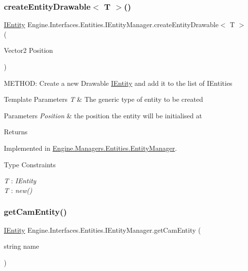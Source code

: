 \subsubsection{\texorpdfstring{create\+Entity\+Drawable$<$ T $>$()}{createEntityDrawable< T >()}}
{\footnotesize\ttfamily \hyperlink{a00438}{I\+Entity} Engine.\+Interfaces.\+Entities.\+I\+Entity\+Manager.\+create\+Entity\+Drawable$<$ T $>$ (\begin{DoxyParamCaption}\item[{Vector2}]{Position }\end{DoxyParamCaption})}



M\+E\+T\+H\+OD\+: Create a new Drawable \hyperlink{a00438}{I\+Entity} and add it to the list of I\+Entities 


\begin{DoxyTemplParams}{Template Parameters}
{\em T} & The generic type of entity to be created\\
\hline
\end{DoxyTemplParams}

\begin{DoxyParams}{Parameters}
{\em Position} & the position the entity will be initialised at\\
\hline
\end{DoxyParams}
\begin{DoxyReturn}{Returns}

\end{DoxyReturn}


Implemented in \hyperlink{a00518_a787212a79eb20bd2c695783b5f802347}{Engine.\+Managers.\+Entities.\+Entity\+Manager}.

\begin{Desc}
\item[Type Constraints]\begin{description}
\item[{\em T} : {\em I\+Entity}]\item[{\em T} : {\em new()}]\end{description}
\end{Desc}
\mbox{\label{a00442_aa1098871f43bbd775954aea10a958c0b}} 
\subsubsection{\texorpdfstring{get\+Cam\+Entity()}{getCamEntity()}}
{\footnotesize\ttfamily \hyperlink{a00438}{I\+Entity} Engine.\+Interfaces.\+Entities.\+I\+Entity\+Manager.\+get\+Cam\+Entity (\begin{DoxyParamCaption}\item[{string}]{name }\end{DoxyParamCaption})}



